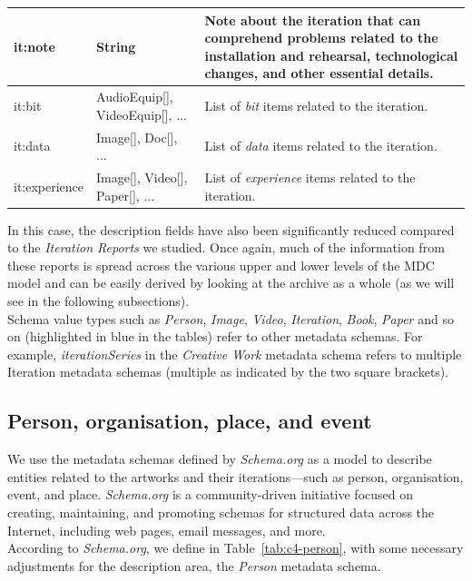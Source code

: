 \begin{longtable}{|p{}|p{}|p{}|}
    \hline
    \scriptsize it:note                    & \scriptsize String                                            &  \scriptsize Note about the iteration that can comprehend problems related to the installation and rehearsal, technological changes, and other essential details. \\
    \hline
    \scriptsize it:bit                     & \scriptsize \textcolor{uniudColor3}{AudioEquip}[], \textcolor{uniudColor3}{VideoEquip}[], ...   &  \scriptsize List of \textit{bit} items related to the iteration.\\
    \hline
   \scriptsize  it:data                    & \scriptsize \textcolor{uniudColor3}{Image}[], \textcolor{uniudColor3}{Doc}[], ...   &  \scriptsize List of \textit{data} items related to the iteration.\\
    \hline
    \scriptsize it:experience              & \scriptsize \textcolor{uniudColor3}{Image}[], \textcolor{uniudColor3}{Video}[], \textcolor{uniudColor3}{Paper}[], ...   &  \scriptsize List of \textit{experience} items related to the iteration.\\
    \hline
\end{longtable}

In this case, the description fields have also been significantly reduced compared to the \textit{Iteration Reports} we studied. Once again, much of the information from these reports is spread across the various upper and lower levels of the MDC model and can be easily derived by looking at the archive as a whole (as we will see in the following subsections).\\
Schema value types such as \textit{Person}, \textit{Image}, \textit{Video}, \textit{Iteration}, \textit{Book}, \textit{Paper} and so on (highlighted in blue in the tables) refer to other metadata schemas. For example, \textit{iterationSeries} in the \textit{Creative Work} metadata schema refers to multiple Iteration metadata schemas (multiple as indicated by the two square brackets).

\subsection{Person, organisation, place, and event}
We use the metadata schemas defined by \textit{Schema.org} as a model to describe entities related to the artworks and their iterations—such as person, organisation, event, and place. \textit{Schema.org} is a community-driven initiative focused on creating, maintaining, and promoting schemas for structured data across the Internet, including web pages, email messages, and more.\\
According to \textit{Schema.org}, we define in Table~\ref{tab:c4-person}, with some necessary adjustments for the description area, the \textit{Person} metadata schema.


